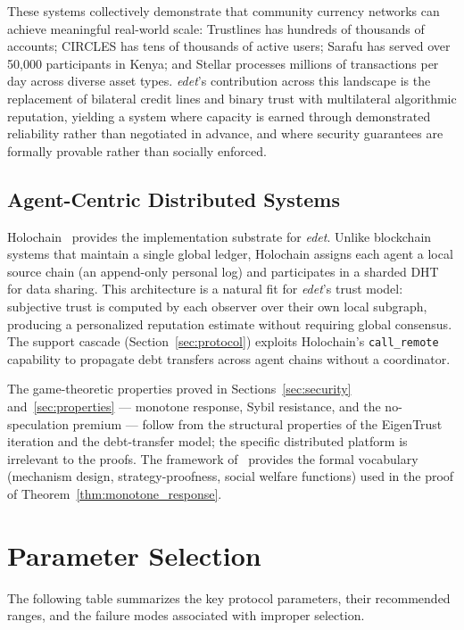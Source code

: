 \documentclass[11pt]{article}
\begin{document}
These systems collectively demonstrate that community currency networks can achieve meaningful real-world scale: Trustlines has hundreds of thousands of accounts; CIRCLES has tens of thousands of active users; Sarafu has served over 50,000 participants in Kenya; and Stellar processes millions of transactions per day across diverse asset types. \emph{edet}'s contribution across this landscape is the replacement of bilateral credit lines and binary trust with multilateral algorithmic reputation, yielding a system where capacity is earned through demonstrated reliability rather than negotiated in advance, and where security guarantees are formally provable rather than socially enforced.

\subsection{Agent-Centric Distributed Systems}

Holochain~\cite{brock2015} provides the implementation substrate for \emph{edet}. Unlike blockchain systems that maintain a single global ledger, Holochain assigns each agent a local source chain (an append-only personal log) and participates in a sharded DHT for data sharing. This architecture is a natural fit for \emph{edet}'s trust model: subjective trust is computed by each observer over their own local subgraph, producing a personalized reputation estimate without requiring global consensus. The support cascade (Section~\ref{sec:protocol}) exploits Holochain's \texttt{call\_remote} capability to propagate debt transfers across agent chains without a coordinator.

The game-theoretic properties proved in Sections~\ref{sec:security} and~\ref{sec:properties} --- monotone response, Sybil resistance, and the no-speculation premium --- follow from the structural properties of the EigenTrust iteration and the debt-transfer model; the specific distributed platform is irrelevant to the proofs. The framework of~\cite{nisan2007} provides the formal vocabulary (mechanism design, strategy-proofness, social welfare functions) used in the proof of Theorem~\ref{thm:monotone_response}.

\section{Parameter Selection}

The following table summarizes the key protocol parameters, their recommended ranges, and the failure modes associated with improper selection.
\end{document}
